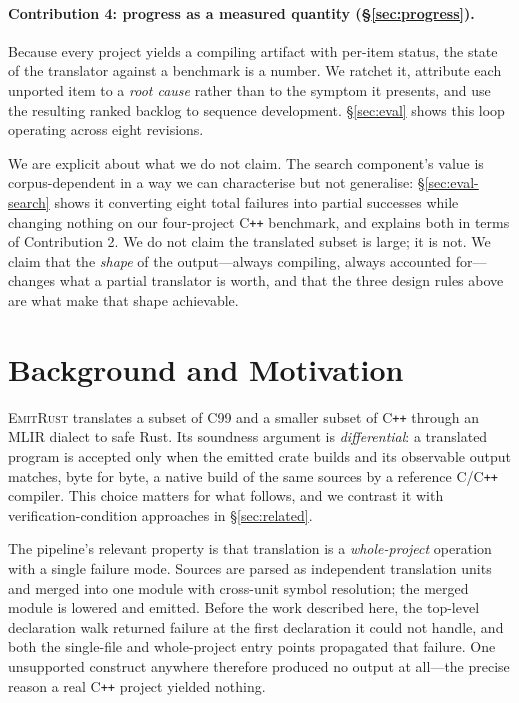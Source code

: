 \documentclass[10pt,twocolumn]{article}
\newcommand{\tool}{\textsc{EmitRust}}
\begin{document}
\paragraph{Contribution 4: progress as a measured quantity
(\S\ref{sec:progress}).} Because every project yields a compiling artifact
with per-item status, the state of the translator against a benchmark is a
number. We ratchet it, attribute each unported item to a \emph{root cause}
rather than to the symptom it presents, and use the resulting ranked backlog
to sequence development. \S\ref{sec:eval} shows this loop operating across
eight revisions.

We are explicit about what we do not claim. The search component's value is
corpus-dependent in a way we can characterise but not generalise:
\S\ref{sec:eval-search} shows it converting eight total failures into partial
successes while changing nothing on our four-project C\texttt{++} benchmark,
and explains both in terms of Contribution 2. We do
not claim the translated subset is large; it is not. We claim that the
\emph{shape} of the output---always compiling, always accounted for---changes
what a partial translator is worth, and that the three design rules above are
what make that shape achievable.

\section{Background and Motivation}
\label{sec:background}

\tool{} translates a subset of C99 and a smaller subset of C\texttt{++}
through an MLIR dialect to safe Rust. Its soundness argument is
\emph{differential}: a translated program is accepted only when the emitted
crate builds and its observable output matches, byte for byte, a native build
of the same sources by a reference C/C\texttt{++} compiler. This choice
matters for what follows, and we contrast it with verification-condition
approaches in \S\ref{sec:related}.

The pipeline's relevant property is that translation is a \emph{whole-project}
operation with a single failure mode. Sources are parsed as independent
translation units and merged into one module with cross-unit symbol
resolution; the merged module is lowered and emitted. Before the work
described here, the top-level declaration walk returned failure at the first
declaration it could not handle, and both the single-file and whole-project
entry points propagated that failure. One unsupported construct anywhere
therefore produced no output at all---the precise reason a real C\texttt{++}
project yielded nothing.
\end{document}
